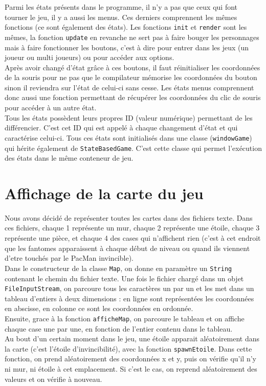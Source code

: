     Parmi les états présents dans le programme, il n'y a pas que ceux qui font tourner le jeu, il y a aussi les menus. Ces derniers comprennent les mêmes fonctions (ce sont également des états). 
    Les fonctions \texttt{init} et \texttt{render} sont les mêmes, la fonction \texttt{update} en revanche ne sert pas à faire bouger les personnages mais à faire fonctionner les boutons, c'est à
    dire pour entrer dans les jeux (un joueur ou multi joueurs) ou pour accéder aux options.\\
    Après avoir changé d'état grâce à ces boutons, il faut réinitialiser les coordonnées de la souris pour ne pas que le compilateur mémorise les coordonnées du bouton sinon il reviendra sur 
    l'état de celui-ci sans cesse. Les états menus comprennent donc aussi une fonction permettant de récupérer les coordonnées du clic de souris pour accéder à un autre état.\\
    Tous les états possèdent leurs propres ID (valeur numérique) permettant de les différencier. C'est cet ID qui est appelé à chaque changement d'état et qui caractérise celui-ci.
    Tous ces états sont initialisés dans une classe (\texttt{windowGame}) qui hérite également de \texttt{StateBasedGame}. C'est cette classe qui permet l'exécution des états dans le même 
    conteneur de jeu.
    
    \section{Affichage de la carte du jeu}
      Nous avons décidé de représenter toutes les cartes dans des fichiers texte. Dans ces fichiers, chaque 1 représente un mur, chaque 2 représente
      une étoile, chaque 3 représente une pièce, et chaque 4 des cases qui n'affichent rien (c'est à cet endroit que les fantomes apparaissent à chaque début de niveau ou quand ils viennent
      d'etre touchés par le PacMan invincible).\\
      Dans le constructeur de la classe \texttt{Map}, on donne en paramètre un \texttt{String} contenant le chemin du fichier texte. Une fois le 
      fichier chargé dans un objet \texttt{FileInputStream}, on parcoure tous les caractères un par un et les met dans un tableau d'entiers à deux dimensions : en ligne sont représentées les 
      coordonnées en abscisse, en colonne ce sont les coordonnées en ordonnée.\\
      Ensuite, grace à la fonction \texttt{afficheMap}, on parcoure le tableau et on affiche chaque case une par une, en fonction de l'entier contenu dans le tableau.\\
      Au bout d'un certain moment dans le jeu, une étoile apparait aléatoirement dans la carte (c'est l'étoile d'invincibilité), avec la fonction \texttt{spawnEtoile}. Dans cette fonction, 
      on prend aléatoirement des coordonnées x et y, puis on vérifie qu'il n'y ni mur, ni étoile à cet emplacement. Si c'est le cas, on reprend aléatoirement des valeurs et on vérifie à nouveau.
    
